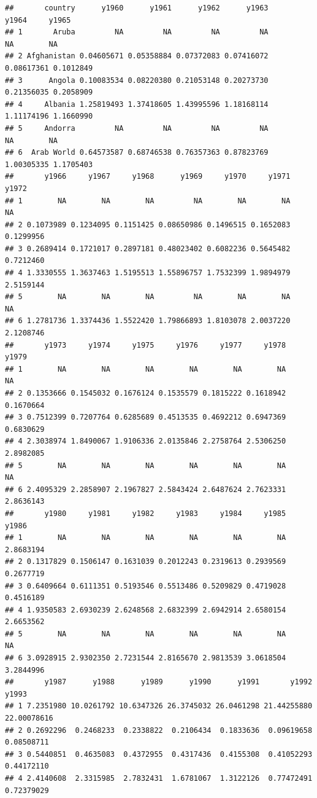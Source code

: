 \documentclass[
]{book}
\begin{document}
\begin{verbatim}
##       country      y1960      y1961      y1962      y1963      y1964     y1965
## 1       Aruba         NA         NA         NA         NA         NA        NA
## 2 Afghanistan 0.04605671 0.05358884 0.07372083 0.07416072 0.08617361 0.1012849
## 3      Angola 0.10083534 0.08220380 0.21053148 0.20273730 0.21356035 0.2058909
## 4     Albania 1.25819493 1.37418605 1.43995596 1.18168114 1.11174196 1.1660990
## 5     Andorra         NA         NA         NA         NA         NA        NA
## 6  Arab World 0.64573587 0.68746538 0.76357363 0.87823769 1.00305335 1.1705403
##       y1966     y1967     y1968      y1969     y1970     y1971     y1972
## 1        NA        NA        NA         NA        NA        NA        NA
## 2 0.1073989 0.1234095 0.1151425 0.08650986 0.1496515 0.1652083 0.1299956
## 3 0.2689414 0.1721017 0.2897181 0.48023402 0.6082236 0.5645482 0.7212460
## 4 1.3330555 1.3637463 1.5195513 1.55896757 1.7532399 1.9894979 2.5159144
## 5        NA        NA        NA         NA        NA        NA        NA
## 6 1.2781736 1.3374436 1.5522420 1.79866893 1.8103078 2.0037220 2.1208746
##       y1973     y1974     y1975     y1976     y1977     y1978     y1979
## 1        NA        NA        NA        NA        NA        NA        NA
## 2 0.1353666 0.1545032 0.1676124 0.1535579 0.1815222 0.1618942 0.1670664
## 3 0.7512399 0.7207764 0.6285689 0.4513535 0.4692212 0.6947369 0.6830629
## 4 2.3038974 1.8490067 1.9106336 2.0135846 2.2758764 2.5306250 2.8982085
## 5        NA        NA        NA        NA        NA        NA        NA
## 6 2.4095329 2.2858907 2.1967827 2.5843424 2.6487624 2.7623331 2.8636143
##       y1980     y1981     y1982     y1983     y1984     y1985     y1986
## 1        NA        NA        NA        NA        NA        NA 2.8683194
## 2 0.1317829 0.1506147 0.1631039 0.2012243 0.2319613 0.2939569 0.2677719
## 3 0.6409664 0.6111351 0.5193546 0.5513486 0.5209829 0.4719028 0.4516189
## 4 1.9350583 2.6930239 2.6248568 2.6832399 2.6942914 2.6580154 2.6653562
## 5        NA        NA        NA        NA        NA        NA        NA
## 6 3.0928915 2.9302350 2.7231544 2.8165670 2.9813539 3.0618504 3.2844996
##       y1987      y1988      y1989      y1990      y1991       y1992       y1993
## 1 7.2351980 10.0261792 10.6347326 26.3745032 26.0461298 21.44255880 22.00078616
## 2 0.2692296  0.2468233  0.2338822  0.2106434  0.1833636  0.09619658  0.08508711
## 3 0.5440851  0.4635083  0.4372955  0.4317436  0.4155308  0.41052293  0.44172110
## 4 2.4140608  2.3315985  2.7832431  1.6781067  1.3122126  0.77472491  0.72379029

\end{verbatim}
\end{document}
